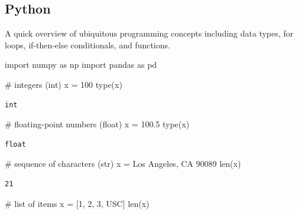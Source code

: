 \documentclass[
  letterpaper,
  DIV=11,
  numbers=noendperiod]{scrreprt}
\newenvironment{Shaded}{\begin{snugshade}}{\end{snugshade}}
\newcommand{\BuiltInTok}[1]{\textcolor[rgb]{0.00,0.23,0.31}{#1}}
\newcommand{\CommentTok}[1]{\textcolor[rgb]{0.37,0.37,0.37}{#1}}
\newcommand{\DecValTok}[1]{\textcolor[rgb]{0.68,0.00,0.00}{#1}}
\newcommand{\FloatTok}[1]{\textcolor[rgb]{0.68,0.00,0.00}{#1}}
\newcommand{\ImportTok}[1]{\textcolor[rgb]{0.00,0.46,0.62}{#1}}
\newcommand{\NormalTok}[1]{\textcolor[rgb]{0.00,0.23,0.31}{#1}}
\newcommand{\OperatorTok}[1]{\textcolor[rgb]{0.37,0.37,0.37}{#1}}
\newcommand{\StringTok}[1]{\textcolor[rgb]{0.13,0.47,0.30}{#1}}
\begin{document}
\subsection{Python}\label{python}

A quick overview of ubiquitous programming concepts including data
types, for loops, if-then-else conditionals, and functions.

\begin{Shaded}
\begin{Highlighting}[]
\ImportTok{import}\NormalTok{ numpy }\ImportTok{as}\NormalTok{ np}
\ImportTok{import}\NormalTok{ pandas }\ImportTok{as}\NormalTok{ pd}
\end{Highlighting}
\end{Shaded}

\begin{Shaded}
\begin{Highlighting}[]
\CommentTok{\# integers (int)}
\NormalTok{x }\OperatorTok{=} \DecValTok{100}
\BuiltInTok{type}\NormalTok{(x)}
\end{Highlighting}
\end{Shaded}

\begin{verbatim}
int
\end{verbatim}

\begin{Shaded}
\begin{Highlighting}[]
\CommentTok{\# floating{-}point numbers (float)}
\NormalTok{x }\OperatorTok{=} \FloatTok{100.5}
\BuiltInTok{type}\NormalTok{(x)}
\end{Highlighting}
\end{Shaded}

\begin{verbatim}
float
\end{verbatim}

\begin{Shaded}
\begin{Highlighting}[]
\CommentTok{\# sequence of characters (str)}
\NormalTok{x }\OperatorTok{=} \StringTok{\textquotesingle{}Los Angeles, CA 90089\textquotesingle{}}
\BuiltInTok{len}\NormalTok{(x)}
\end{Highlighting}
\end{Shaded}

\begin{verbatim}
21
\end{verbatim}

\begin{Shaded}
\begin{Highlighting}[]
\CommentTok{\# list of items}
\NormalTok{x }\OperatorTok{=}\NormalTok{ [}\DecValTok{1}\NormalTok{, }\DecValTok{2}\NormalTok{, }\DecValTok{3}\NormalTok{, }\StringTok{\textquotesingle{}USC\textquotesingle{}}\NormalTok{]}
\BuiltInTok{len}\NormalTok{(x)}
\end{Highlighting}
\end{Shaded}
\end{document}
